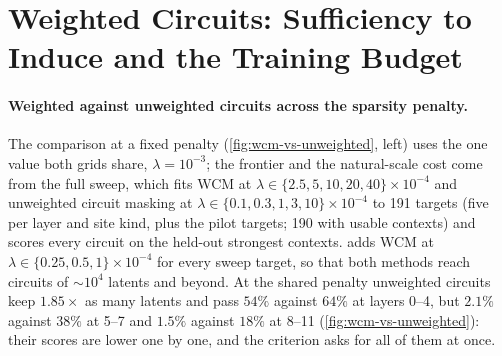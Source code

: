 \documentclass[10pt]{article}
\begin{document}
\section{Weighted Circuits: Sufficiency to Induce and the Training Budget}
\label{app:weighted-details}

\paragraph{Weighted against unweighted circuits across the sparsity penalty.}
The comparison at a fixed penalty (\cref{fig:wcm-vs-unweighted}, left) uses the one value both grids share, $\lambda = 10^{-3}$; the frontier and the natural-scale cost come from the full sweep, which fits WCM at $\lambda \in \{2.5, 5, 10, 20, 40\} \times 10^{-4}$ and unweighted circuit masking at $\lambda \in \{0.1, 0.3, 1, 3, 10\} \times 10^{-4}$ to 191 targets (five per layer and site kind, plus the pilot targets; 190 with usable contexts) and scores every circuit on the held-out strongest contexts.
 adds WCM at $\lambda \in \{0.25, 0.5, 1\} \times 10^{-4}$ for every sweep target, so that both methods reach circuits of ${\sim}10^{4}$ latents and beyond.
At the shared penalty unweighted circuits keep $1.85\times$ as many latents and pass $54\%$ against $64\%$ at layers 0--4, but $2.1\%$ against $38\%$ at 5--7 and $1.5\%$ against $18\%$ at 8--11 (\cref{fig:wcm-vs-unweighted}): their scores are lower one by one, and the criterion asks for all of them at once.
\end{document}
